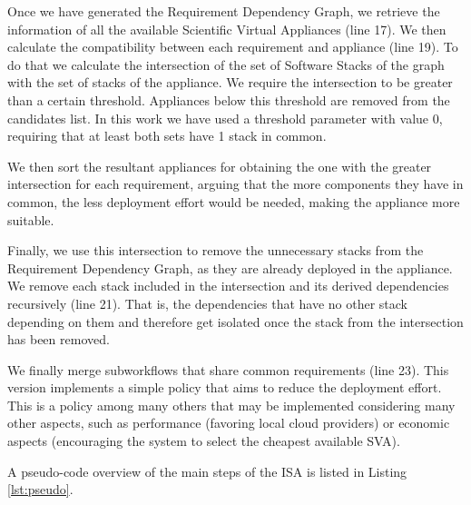 Once we have generated the Requirement Dependency Graph, we retrieve the information of all the available Scientific Virtual Appliances (line 17). We then calculate the compatibility between each requirement and appliance (line 19). To do that we calculate the intersection of the set of Software Stacks of the graph with the set of stacks of the appliance. We require the intersection to be greater than a certain threshold. Appliances below this threshold are removed from the candidates list. In this work we have used a threshold parameter with value 0, requiring that at least both sets have 1 stack in common. 

We then sort the resultant appliances for obtaining the one with the greater intersection for each requirement, arguing that the more components they have in common, the less deployment effort would be needed, making the appliance more suitable.

Finally, we use this intersection to remove the unnecessary stacks from the Requirement Dependency Graph, as they are already deployed in the appliance. We remove each stack included in the intersection and its derived dependencies recursively (line 21). That is, the dependencies that have no other stack depending on them and therefore get isolated once the stack from the intersection has been removed. 

We finally merge subworkflows that share common requirements (line 23). This version implements a simple policy that aims to reduce the deployment effort. This is a policy among many others that may be implemented considering many other aspects, such as performance (favoring local cloud providers) or economic aspects (encouraging the system to select the cheapest available SVA).

A pseudo-code overview of the main steps of the ISA is listed in Listing \ref{lst:pseudo}.

          
